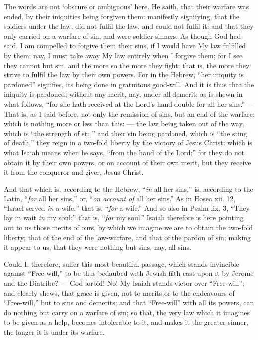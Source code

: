 The words are not ‘obscure or ambiguous’ here. He saith, that their warfare was ended, by their iniquities being forgiven them: manifestly signifying, that the soldiers under the law, did not fulfil the law, and could not fulfil it: and that they only carried on a warfare of sin, and were soldier-sinners. As though God had said, I am compelled to forgive them their sins, if I would have My law fulfilled by them; nay, I must take away My law entirely when I forgive them; for I see they cannot but sin, and the more so the more they fight; that is, the more they strive to fulfil the law by their own powers. For in the Hebrew, “her iniquity is pardoned” signifies, its being done in gratuitous good-will. And it is thus that the iniquity is pardoned; without any merit, nay, under all demerit; as is shewn in what follows, “for she hath received at the Lord’s hand double for all her sins.” — That is, as I said before, not only the remission of sins, but an end of the warfare: which is nothing more or less than this: — the law being taken out of the way, which is “the strength of sin,” and their sin being pardoned, which is “the sting of death,” they reign in a two-fold liberty by the victory of Jesus Christ: which is what Isaiah means when he says, “from the hand of the Lord:” for they do not obtain it by their own powers, or on account of their own merit, but they receive it from the conqueror and giver, Jesus Christ.

And that which is, according to the Hebrew, “\emph{in} all her sins,” is, according to the Latin, “\emph{for }all her sins,” or, “\emph{on account of }all her sins.” As in Hosea xii. 12, “Israel served \emph{in }a wife:” that is, “\emph{for} a wife.” And so also in Psalm lix. 3, “They lay in wait \emph{in }my soul;” that is, “\emph{for }my soul.” Isaiah therefore is here pointing out to us those merits of ours, by which we imagine we are to obtain the two-fold liberty; that of the end of the law-warfare, and that of the pardon of sin; making it appear to us, that they were nothing but sins, nay, all sins.

Could I, therefore, suffer this most beautiful passage, which stands invincible against “Free-will,” to be thus bedaubed with Jewish filth cast upon it by Jerome and the Diatribe? — God forbid! No! My Isaiah stands victor over “Free-will”; and clearly shews, that grace is given, not to merits or to the endeavours of “Free-will,” but to sins and demerits; and that “Free-will” with all its powers, can do nothing but carry on a warfare of sin; so that, the very law which it imagines to be given as a help, becomes intolerable to it, and makes it the greater sinner, the longer it is under its warfare.

